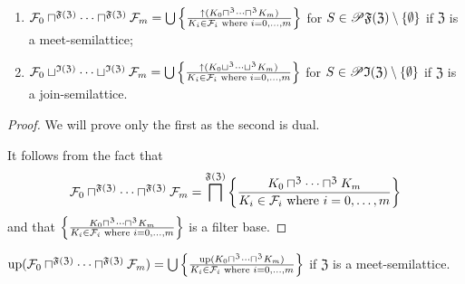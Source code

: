 \begin{thm}
~
\begin{enumerate}
\item $\mathcal{F}_{0}\sqcap^{\mathfrak{F}(\mathfrak{Z})}\dots\sqcap^{\mathfrak{F}(\mathfrak{Z})}\mathcal{F}_{m}=\bigcup\left\{ \frac{\uparrow(K_{0}\sqcap^{\mathfrak{Z}}\dots\sqcap^{\mathfrak{Z}}K_{m})}{K_{i}\in\mathcal{F}_{i}\text{ where }i=0,\dots,m}\right\}$
for $S\in\mathscr{P}\mathfrak{F}(\mathfrak{Z})\setminus\{\emptyset\}$
if $\mathfrak{Z}$ is a meet-semilattice;
\item $\mathcal{F}_{0}\sqcup^{\mathfrak{I}(\mathfrak{Z})}\dots\sqcup^{\mathfrak{I}(\mathfrak{Z})}\mathcal{F}_{m}=\bigcup\left\{ \frac{\uparrow(K_{0}\sqcup^{\mathfrak{Z}}\dots\sqcup^{\mathfrak{Z}}K_{m})}{K_{i}\in\mathcal{F}_{i}\text{ where }i=0,\dots,m}\right\}$
for $S\in\mathscr{P}\mathfrak{I}(\mathfrak{Z})\setminus\{\emptyset\}$
if $\mathfrak{Z}$ is a join-semilattice.
\end{enumerate}
\end{thm}
\begin{proof}
We will prove only the first as the second is dual.

It follows from the fact that 
\[
\mathcal{F}_{0}\sqcap^{\mathfrak{F}(\mathfrak{Z})}\dots\sqcap^{\mathfrak{F}(\mathfrak{Z})}\mathcal{F}_{m}=
\bigsqcap^{\mathfrak{F}(\mathfrak{Z})}\left\{ \frac{K_{0}\sqcap^{\mathfrak{Z}}\dots\sqcap^{\mathfrak{Z}}K_{m}}{K_{i}\in\mathcal{F}_{i}\text{ where }i=0,\dots,m}\right\}
\]
and that $\left\{ \frac{K_{0}\sqcap^{\mathfrak{Z}}\dots\sqcap^{\mathfrak{Z}}K_{m}}{K_{i}\in\mathcal{F}_{i}\text{ where }i=0,\dots,m}\right\}$
is a filter base.\end{proof}
\begin{cor}
$\operatorname{up}(\mathcal{F}_{0}\sqcap^{\mathfrak{F}(\mathfrak{Z})}\dots\sqcap^{\mathfrak{F}(\mathfrak{Z})}\mathcal{F}_{m})=\bigcup\left\{ \frac{\operatorname{up}(K_{0}\sqcap^{\mathfrak{Z}}\dots\sqcap^{\mathfrak{Z}}K_{m})}{K_{i}\in\mathcal{F}_{i}\text{ where }i=0,\dots,m}\right\}$
if $\mathfrak{Z}$ is a meet-semilattice.
\end{cor}

